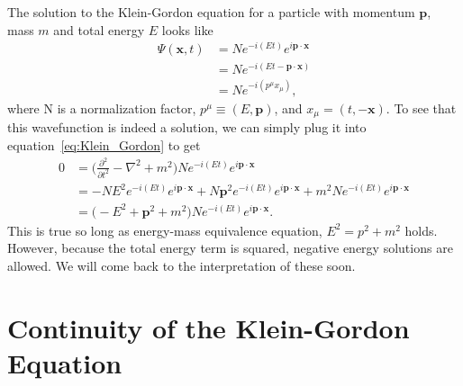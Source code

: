 \documentclass[titlepage,letterpaper,onecolumn,11pt,final]{report}
\newcommand{\psxt}{\Psi (\mathbf{x},t)}
\numberwithin{equation}{section}
\numberwithin{figure}{section}
\begin{document}
The solution to the Klein-Gordon equation for a particle with momentum $\mathbf{p}$, mass $m$ and total energy $E$ looks like
\begin{subequations}
\label{eq:Klein_gordon_wavefunction}
\begin{align}
	\psxt &= N e^{-i(E t)} e^{i \mathbf{p} \cdot \mathbf{x}} \\
	&= N e^{-i \left(E t - \mathbf{p} \cdot \mathbf{x} \right)} \\
	&= N e^{-i \left(p^{\mu} x_{\mu} \right)},
\end{align}
\end{subequations}
%
where N is a normalization factor, $p^{\mu} \equiv (E, \mathbf{p})$, and $x_{\mu} = (t, - \mathbf{x})$. To see that this wavefunction is indeed a solution, we can simply plug it into equation~\ref{eq:Klein_Gordon} to get
\begin{equation}
	\begin{split}
	0 &= \bigg( \frac{\partial^{2}}{\partial t^{2}} - \nabla^{2} + m^{2} \bigg) N e^{-i(E t)} e^{i \mathbf{p} \cdot \mathbf{x}} \\
	&= -N E^{2} e^{-i(E t)} e^{i \mathbf{p} \cdot \mathbf{x}} + N \mathbf{p}^{2} e^{-i(E t)} e^{i \mathbf{p} \cdot \mathbf{x}} + m^{2} N e^{-i(E t)} e^{i \mathbf{p} \cdot \mathbf{x}} \\
	&= \bigg( -E^{2} + \mathbf{p}^{2} + m^{2} \bigg) N e^{-i(E t)} e^{i \mathbf{p} \cdot \mathbf{x}} .
	\end{split}
\end{equation}
%
This is true so long as energy-mass equivalence equation, $E^{2} = p^{2} + m^{2}$ holds. However, because the total energy term is squared, negative energy solutions are allowed. We will come back to the interpretation of these soon.

\section{Continuity of the Klein-Gordon Equation}
\end{document}
